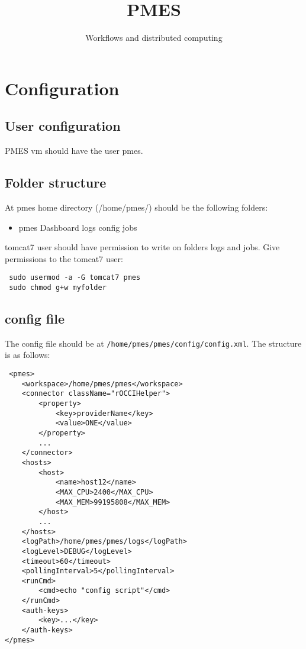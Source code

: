 \documentclass[a4paper,10pt]{article}
\title{PMES}
\author{Workflows and distributed computing}
\begin{document}
\maketitle

\section{Configuration}
\subsection{User configuration}
PMES vm should have the user pmes.

\subsection{Folder structure}
At pmes home directory (/home/pmes/) should be the following folders:
\begin{itemize}
\item pmes
 \subitem Dashboard
 \subitem logs
 \subitem config
 \subitem jobs
\end{itemize}

tomcat7 user should have permission to write on folders logs and jobs.
Give permissions to the tomcat7 user:
\begin{verbatim}
 sudo usermod -a -G tomcat7 pmes
 sudo chmod g+w myfolder
\end{verbatim}

\subsection{config file}
The config file should be at \texttt{/home/pmes/pmes/config/config.xml}. The structure is as follows:

\begin{verbatim}
 <pmes>
    <workspace>/home/pmes/pmes</workspace>
    <connector className="rOCCIHelper">
        <property>
            <key>providerName</key>
            <value>ONE</value>
        </property>
        ...              
    </connector>    
    <hosts>
        <host>
            <name>host12</name>
            <MAX_CPU>2400</MAX_CPU>
            <MAX_MEM>99195808</MAX_MEM>
        </host>
        ...
    </hosts>
    <logPath>/home/pmes/pmes/logs</logPath>
    <logLevel>DEBUG</logLevel>
    <timeout>60</timeout>
    <pollingInterval>5</pollingInterval>
    <runCmd>
        <cmd>echo "config script"</cmd>
    </runCmd>    
    <auth-keys>
        <key>...</key>
    </auth-keys>
</pmes>
\end{verbatim}
\end{document}
